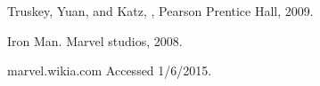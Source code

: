 \documentclass[twocolumn]{IEEEtran}
\begin{document}
\begin{thebibliography}{50}

Truskey, Yuan, and Katz,
, Pearson Prentice Hall, 2009.

Iron Man. Marvel studios, 2008.


marvel.wikia.com Accessed 1/6/2015.


\end{thebibliography}
\end{document}
